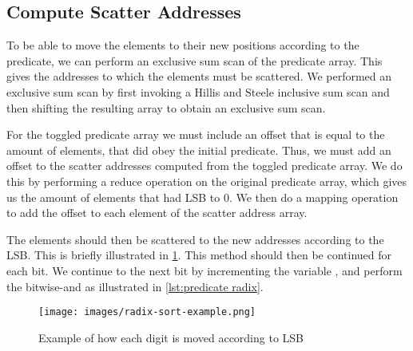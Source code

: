 \subsection*{Compute Scatter Addresses}

To be able to move the elements to their new positions according to the predicate, we can perform an exclusive sum scan of the predicate array.
This gives the addresses to which the elements must be scattered.
We performed an exclusive sum scan by first invoking a Hillis and Steele inclusive sum scan and then shifting the resulting array to obtain an exclusive sum scan.

For the toggled predicate array we must include an offset that is equal to the amount of elements, that did obey the initial predicate.
Thus, we must add an offset to the scatter addresses computed from the toggled predicate array.
We do this by performing a reduce operation on the original predicate array, which gives us the amount of elements that had LSB to 0.
We then do a mapping operation to add the offset to each element of the scatter address array.

The elements should then be scattered to the new addresses according to the LSB.
This is briefly illustrated in \cref{fig:radix sort example}.
This method should then be continued for each bit.
We continue to the next bit by incrementing the variable , and perform the bitwise-and as illustrated in \cref{lst:predicate radix}.

\begin{figure}[htb]
  \centering
  \texttt{[image: images/radix-sort-example.png]}
  \caption{Example of how each digit is moved according to LSB}
  \label{fig:radix sort example}
\end{figure}


